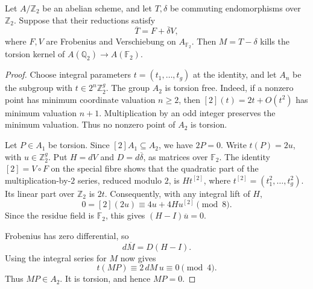 \begin{lemma}\label{lem:dyadic-formal-Hecke-kernel}
Let $A/\mathbb Z_2$ be an abelian scheme, and let $T,\delta$ be
commuting endomorphisms over $\mathbb Z_2$. Suppose that their
reductions satisfy
\[
 \overline T=F+\overline\delta V,
\]
where $F,V$ are Frobenius and Verschiebung on $A_{\mathbb F_2}$.
Then $M=T-\delta$ kills the torsion kernel of
$A(\mathbb Q_2)\to A(\mathbb F_2)$.
\end{lemma}
\begin{proof}
Choose integral parameters $t=(t_1,\ldots,t_g)$ at the identity,
and let $A_n$ be the subgroup with $t\in2^n\mathbb Z_2^g$.
The group $A_2$ is torsion free.
Indeed, if a nonzero point has minimum coordinate valuation
$n\geq2$, then $[2](t)=2t+O(t^2)$ has minimum valuation $n+1$.
Multiplication by an odd integer preserves the minimum valuation.
Thus no nonzero point of $A_2$ is torsion.

Let $P\in A_1$ be torsion. Since $[2]A_1\subseteq A_2$, we have
$2P=0$. Write $t(P)=2u$, with $u\in\mathbb Z_2^g$.
Put $H=dV$ and $D=d\overline\delta$, as matrices over $\mathbb F_2$.
The identity $[2]=V\circ F$ on the special fibre shows that the
quadratic part of the multiplication-by-$2$ series, reduced
modulo $2$, is $H t^{[2]}$, where $t^{[2]}=(t_1^2,\ldots,t_g^2)$.
Its linear part over $\mathbb Z_2$ is $2t$.
Consequently, with any integral lift of $H$,
\[
 0=[2](2u)\equiv4u+4H u^{[2]}\pmod8.
\]
Since the residue field is $\mathbb F_2$, this gives
$(H-I)\overline u=0$.

Frobenius has zero differential, so
\[
 d\overline M=D(H-I).
\]
Using the integral series for $M$ now gives
\[
 t(MP)\equiv2\,dM\,u\equiv0\pmod4.
\]
Thus $MP\in A_2$. It is torsion, and hence $MP=0$.
\end{proof}

